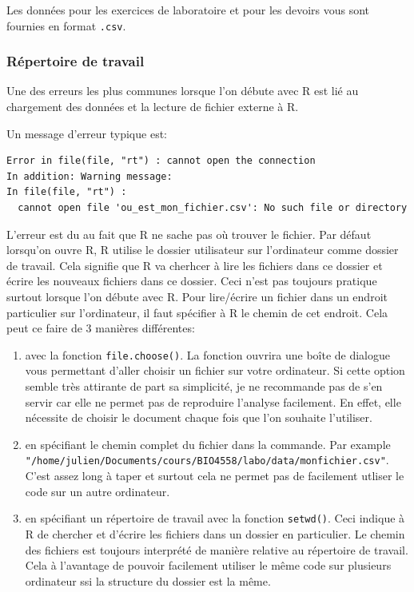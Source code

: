 \documentclass[12pt,]{book}
\makeatletter
\providecommand{\tightlist}{%
  \setlength{\itemsep}{0pt}\setlength{\parskip}{0pt}}
\newenvironment{kframe}{%
\medskip{}
\setlength{\fboxsep}{.8em}
\def\at@end@of@kframe{}%
\ifinner\ifhmode%
 \def\at@end@of@kframe{\end{minipage}}%
 \begin{minipage}{\columnwidth}%
\fi\fi%
\def\FrameCommand##1{\hskip\@totalleftmargin \hskip-\fboxsep
\colorbox{incolor}{##1}\hskip-\fboxsep
    \hskip-\linewidth \hskip-\@totalleftmargin \hskip\columnwidth}%
\MakeFramed {\advance\hsize-\width
  \@totalleftmargin\z@ \linewidth\hsize
  \@setminipage}}%
{\par\unskip\endMakeFramed%
\at@end@of@kframe}
\newenvironment{rmdblock}[1]
 {
 \begin{itemize}
 \renewcommand{\labelitemi}{
   \raisebox{-.7\height}[0pt][0pt]{
     {\setkeys{Gin}{width=3em,keepaspectratio}\texttt{[image: images/\#1]}}
   }
 }
 \begin{kframe}
 \setlength{\fboxsep}{1em}
 \item
 }
 {
 \end{kframe}
 \end{itemize}
 }
\newenvironment{rmdwarning}
  {\begin{rmdblock}{warning}}
  {\end{rmdblock}}
\makeatother
\begin{document}
Les données pour les exercices de laboratoire et pour les devoirs vous sont fournies en format \texttt{.csv}.

\hypertarget{ruxe9pertoire-de-travail}{%
\subsubsection{Répertoire de travail}\label{ruxe9pertoire-de-travail}}

\begin{rmdwarning}
Une des erreurs les plus communes lorsque l'on débute avec R est lié au chargement des données et la lecture de fichier externe à R.
\end{rmdwarning}
Un message d'erreur typique est:

\begin{verbatim}
Error in file(file, "rt") : cannot open the connection
In addition: Warning message:
In file(file, "rt") :
  cannot open file 'ou_est_mon_fichier.csv': No such file or directory
\end{verbatim}

L'erreur est du au fait que R ne sache pas où trouver le fichier. Par défaut lorsqu'on ouvre R, R utilise le dossier utilisateur sur l'ordinateur comme dossier de travail. Cela signifie que R va cherhcer à lire les fichiers dans ce dossier et écrire les nouveaux fichiers dans ce dossier. Ceci n'est pas toujours pratique surtout lorsque l'on débute avec R.
Pour lire/écrire un fichier dans un endroit particulier sur l'ordinateur, il faut spécifier à R le chemin de cet endroit. Cela peut ce faire de 3 manières différentes:

\begin{enumerate}
\def\labelenumi{\arabic{enumi}.}
\tightlist
\item
  avec la fonction \texttt{file.choose()}. La fonction ouvrira une boîte de dialogue vous permettant d'aller choisir un fichier sur votre ordinateur. Si cette option semble très attirante de part sa simplicité, je ne recommande pas de s'en servir car elle ne permet pas de reproduire l'analyse facilement. En effet, elle nécessite de choisir le document chaque fois que l'on souhaite l'utiliser.
\item
  en spécifiant le chemin complet du fichier dans la commande. Par example \texttt{"/home/julien/Documents/cours/BIO4558/labo/data/monfichier.csv"}. C'est assez long à taper et surtout cela ne permet pas de facilement utliser le code sur un autre ordinateur.
\item
  en spécifiant un répertoire de travail avec la fonction \texttt{setwd()}. Ceci indique à R de chercher et d'écrire les fichiers dans un dossier en particulier. Le chemin des fichiers est toujours interprété de manière relative au répertoire de travail. Cela à l'avantage de pouvoir facilement utiliser le même code sur plusieurs ordinateur ssi la structure du dossier est la même.
\end{enumerate}
\end{document}
